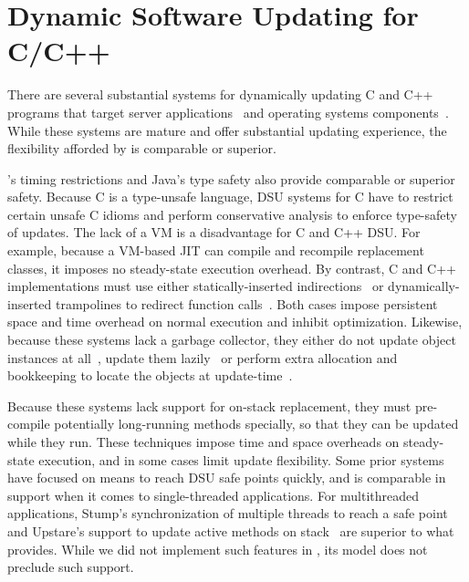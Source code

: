 \section{Dynamic Software Updating for C/C++}

There are several substantial systems for dynamically updating C and C++
programs that target server applications~\cite{HjalmtyssonG98,
altekar05opus, neamtiu06dsu, chen:icse07, upstare, neamtiu09stump} and
operating systems components~\cite{K42reconfig, k42usenix, chen06vee,
lee06linuxmod, dynamos_eurosys_07}.  While these systems are mature
and offer substantial updating experience, the flexibility afforded by \JV
is comparable or superior. 

\JV's timing restrictions and Java's type
safety also provide comparable or superior safety. Because C is a type-unsafe
language, DSU systems for C have to restrict certain unsafe C idioms and
perform conservative analysis to enforce type-safety of updates.
The lack of a VM is a disadvantage for
C and C++ DSU.  For example, because a VM-based JIT can compile and
recompile replacement classes, it imposes no steady-state execution
overhead.  By contrast, C and C++ implementations must use either
statically-inserted indirections~\cite{HjalmtyssonG98, neamtiu06dsu,
K42reconfig, k42usenix, upstare} or dynamically-inserted trampolines to
redirect function calls~\cite{altekar05opus, chen06vee, chen:icse07,
ksplice}.  Both cases impose persistent space and time overhead on normal
execution and inhibit optimization.  Likewise, because these systems lack a
garbage collector, they either do not update object instances at
all~\cite{ksplice}, update them lazily~\cite{neamtiu06dsu, chen:icse07} or
perform extra allocation and bookkeeping to locate the objects at
update-time~\cite{k42usenix}.

Because these systems lack support
for on-stack replacement, they must pre-compile potentially long-running
methods specially, so that they can be updated while they run. These
techniques impose time and space overheads on steady-state execution, and
in some cases limit update flexibility.
Some prior
systems~\cite{neamtiu09stump, upstare, chen:icse07} have focused on means
to reach DSU safe points quickly, and \JV is comparable in support when it
comes to single-threaded applications. For multithreaded applications, {\sc
Stump}'s synchronization of multiple threads to reach a safe
point~\cite{neamtiu09stump} and Upstare's support to update active methods
on stack~\cite{upstare} are superior to what \JV provides. While we did not
implement such features in \JV, its model does not preclude such support.

